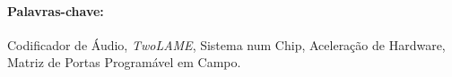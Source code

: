 \paragraph{\hspace{0.5cm} \Large{Palavras-chave:}} Codificador de Áudio, \textit{TwoLAME}, Sistema num Chip, Aceleração de Hardware, Matriz de Portas Programável em Campo.